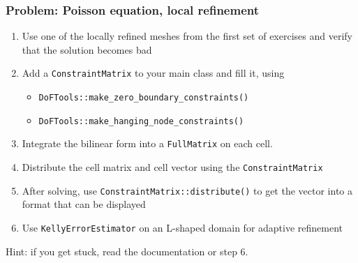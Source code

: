 
\begin{frame}
  \frametitle{Problem: Poisson equation, local refinement}
  \begin{enumerate}
  \item Use one of the locally refined meshes from the first set of
    exercises and verify that the solution becomes bad
  \item Add a \lstinline!ConstraintMatrix! to your main class and fill it, using
    \begin{itemize}
    \item \lstinline!DoFTools::make_zero_boundary_constraints()!
    \item \lstinline!DoFTools::make_hanging_node_constraints()!
    \end{itemize}
  \item Integrate the bilinear form into a \lstinline!FullMatrix! on
    each cell.
  \item Distribute the cell matrix and cell vector using the
    \lstinline!ConstraintMatrix!
  \item After solving, use \lstinline!ConstraintMatrix::distribute()!
    to get the vector into a format that can be displayed
  \item Use \lstinline!KellyErrorEstimator! on an L-shaped domain for
    adaptive refinement
  \end{enumerate}
Hint: if you get stuck, read the documentation or step 6.
\end{frame}
